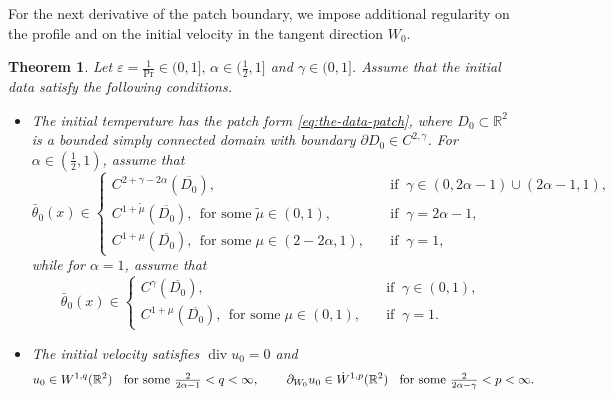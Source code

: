 \documentclass[reqno,11pt,a4paper]{amsart}
\newtheorem{theorem}{Theorem}[section]
\begin{document}
For the next derivative of the patch boundary, we impose additional
regularity on the profile and on the initial velocity in the tangent
direction $W_0$.
\begin{theorem}\label{thm:main2}
Let $\varepsilon=\frac{1}{\mathrm{Pr}}\in(0,1],\,\alpha\in (\frac{1}{2},1]$ and $\gamma\in(0,1]$.
Assume that the initial data satisfy the following conditions.
\begin{itemize}
\item The initial temperature has the patch form \eqref{eq:the-data-patch}, %
where $D_0\subset \mathbb{R}^2$ is a bounded simply connected domain with boundary 
$\partial D_0\in C^{2,\gamma}$. 
For $\alpha\in(\frac{1}{2},1)$, assume that
\begin{equation}\label{eq:bar-the-cd3}
  \bar{\theta}_0(x) \in
  \begin{cases}
    C^{2 + \gamma-2\alpha}(\overline{D_0}),\quad & \textrm{if}\;\;\gamma\in(0,2\alpha-1) \cup (2\alpha -1,1),\\
    C^{1+\widetilde{\mu}}(\overline{D_0}),\,\;\textrm{for some}\;\widetilde{\mu}\in(0,1), \quad
    & \textrm{if}\;\; \gamma = 2\alpha-1,\\
    C^{1+\mu}(\overline{D_0}),\,\;\textrm{for some}\;\mu\in(2-2\alpha,1), \quad
    & \textrm{if}\;\; \gamma = 1,
  \end{cases}
\end{equation}
while for $\alpha=1$, assume that
\begin{equation}\label{eq:bar-the-cd4}
  \bar{\theta}_0(x) \in
  \begin{cases}
    C^{\gamma}(\overline{D_0}),\quad & \textrm{if}\;\;\gamma\in(0,1),\\
    C^{1+\mu}(\overline{D_0}),\,\;\textrm{for some}\;\mu\in(0,1), \quad
    & \textrm{if}\;\; \gamma = 1.
  \end{cases}
\end{equation}
\item The initial velocity satisfies $\operatorname{div}u_0=0$ and
\begin{align*}
  \textrm{$u_0 \in W^{1,q}(\mathbb{R}^2)$\;\; for some $\tfrac{2}{2\alpha-1}<q<\infty$, \qquad
  $\partial_{W_0}u_0\in \dot{W}^{1,p}(\mathbb{R}^2)$\;\; for some $\tfrac{2}{2\alpha-\gamma}<p<\infty$}.
\end{align*}
\end{itemize}

\end{theorem}
\end{document}
